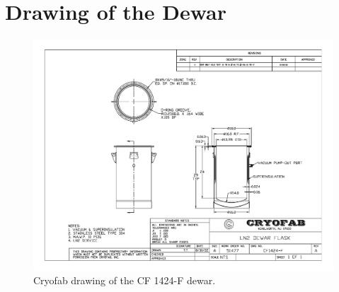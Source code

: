 \section{Drawing of the Dewar}
\label{app:dewar_drawing}

\begin{figure}[h]
    \centering
    \includegraphics[width=\textwidth,angle=90]{fig/DewarDrawing.pdf}
    \caption{Cryofab drawing of the CF 1424-F dewar.}
    \label{fig:dewar}
\end{figure}